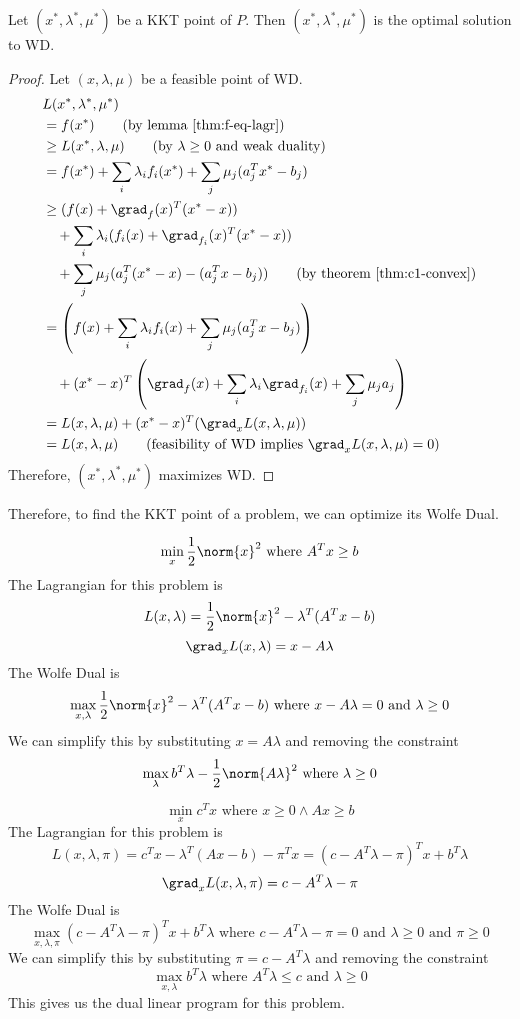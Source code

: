 \begin{theorem}
Let $(x^*, \lambda^*, \mu^*)$ be a KKT point of $P$.
Then $(x^*, \lambda^*, \mu^*)$ is the optimal solution to WD.
\end{theorem}
\begin{proof}
Let $(x, \lambda, \mu)$ be a feasible point of WD.
\begin{align*}
& L(x^*, \lambda^*, \mu^*)
\\ &= f(x^*)  \tag{by lemma \ref{thm:f-eq-lagr}}
\\ &\ge L(x^*, \lambda, \mu)  \tag{by $\lambda \ge 0$ and weak duality}
\\ &= f(x^*) + \sum_i \lambda_if_i(x^*) + \sum_j \mu_j(a_j^Tx^*- b_j)
\\ &\ge (f(x) + \grad_f(x)^T(x^* - x))
\\ &\quad + \sum_i \lambda_i (f_i(x) + \grad_{f_i}(x)^T(x^* - x))
\\ &\quad + \sum_j \mu_j (a_j^T(x^* - x) - (a_j^Tx - b_j))
\tag{by theorem \ref{thm:c1-convex}}
\\ &= \left(f(x) + \sum_i \lambda_i f_i(x) + \sum_j \mu_j (a_j^Tx - b_j)\right)
\\ &\quad + (x^* - x)^T\left( \grad_f(x) + \sum_i \lambda_i \grad_{f_i}(x) + \sum_j \mu_j a_j \right)
\\ &= L(x, \lambda, \mu) + (x^* - x)^T(\grad_x L(x, \lambda, \mu))
\\ &= L(x, \lambda, \mu)  \tag{feasibility of WD implies $\grad_x L(x, \lambda, \mu) = 0$}
\end{align*}
Therefore, $(x^*, \lambda^*, \mu^*)$ maximizes WD.
\end{proof}

Therefore, to find the KKT point of a problem, we can optimize its Wolfe Dual.

\begin{example}
\[ \min_x \frac{1}{2} \norm{x}^2 \textrm{ where } A^Tx \ge b \]
The Lagrangian for this problem is
\[ L(x, \lambda) = \frac{1}{2}\norm{x}^2 - \lambda^T(A^Tx - b) \]
\[ \grad_x L(x, \lambda) = x - A\lambda \]
The Wolfe Dual is
\[ \max_{x, \lambda} \frac{1}{2}\norm{x}^2 - \lambda^T(A^Tx - b)
\textrm{ where } x - A\lambda = 0 \textrm{ and } \lambda \ge 0 \]
We can simplify this by substituting $x = A\lambda$ and removing the constraint
\[ \max_{\lambda} b^T\lambda - \frac{1}{2} \norm{A\lambda}^2 \textrm{ where } \lambda \ge 0 \]
\end{example}

\begin{example}
\[ \min_x c^Tx \textrm{ where } x \ge 0 \wedge Ax \ge b \]
The Lagrangian for this problem is
\[ L(x, \lambda, \pi) = c^Tx - \lambda^T(Ax - b) - \pi^Tx = (c - A^T\lambda - \pi)^Tx + b^T\lambda \]
\[ \grad_x L(x, \lambda, \pi) = c - A^T\lambda - \pi \]
The Wolfe Dual is
\[ \max_{x, \lambda, \pi} (c - A^T\lambda - \pi)^Tx + b^T\lambda
\textrm{ where } c - A^T\lambda - \pi  = 0 \textrm{ and } \lambda \ge 0 \textrm{ and } \pi \ge 0 \]
We can simplify this by substituting $\pi = c - A^T\lambda$ and removing the constraint
\[ \max_{x, \lambda} b^T\lambda
\textrm{ where } A^T\lambda \le c \textrm{ and } \lambda \ge 0 \]
This gives us the dual linear program for this problem.
\end{example}


